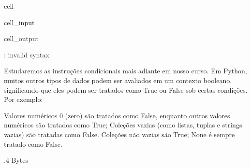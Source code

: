 \documentclass[letterpaper,10pt,english]{jupyterBook}
\begin{document}
\begin{sphinxuseclass}{cell}\begin{sphinxVerbatimInput}

\begin{sphinxuseclass}{cell_input}
\begin{sphinxVerbatim}[commandchars=\\\{\}]
   
    
\end{sphinxVerbatim}

\end{sphinxuseclass}\end{sphinxVerbatimInput}
\begin{sphinxVerbatimOutput}

\begin{sphinxuseclass}{cell_output}
\begin{sphinxVerbatim}[commandchars=\\\{\}]
        
: invalid syntax
\end{sphinxVerbatim}

\end{sphinxuseclass}\end{sphinxVerbatimOutput}

\end{sphinxuseclass}
\sphinxAtStartPar
Estudaremos as instruções condicionais mais adiante em nosso curso. Em Python, muitos outros tipos de dados podem ser avaliados em um contexto booleano, significando que eles podem ser tratados como True ou False sob certas condições. Por exemplo:

\sphinxAtStartPar
Valores numéricos 0 (zero) são tratados como False, enquanto outros valores numéricos são tratados como True;
Coleções vazias (como listas, tuplas e strings vazias) são tratadas como False. Coleções não vazias são True;
None é sempre tratado como False.

.4 Bytes
\end{document}
